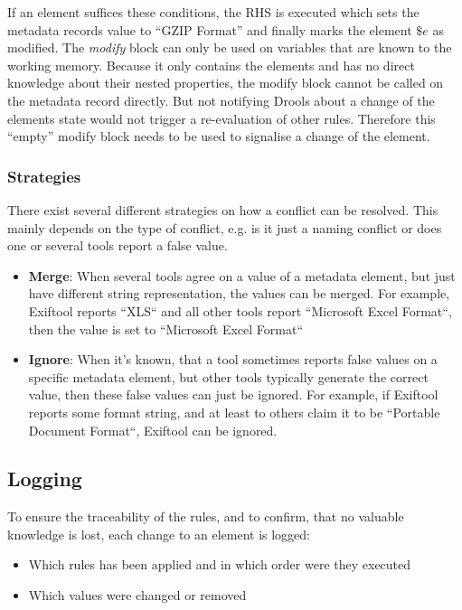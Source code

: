 \documentclass[a4paper,12pt]{article}
\begin{document}
If an element suffices these conditions, the RHS is executed which sets the metadata records value to ``GZIP Format'' and finally marks the element $\$e$ as modified. The \emph{modify} block can only be used on variables that are known to the working memory. Because it only contains the elements and has no direct knowledge about their nested properties, the modify block cannot be called on the metadata record directly. But not notifying Drools about a change of the elements state would not trigger a re-evaluation of other rules. Therefore this ``empty'' modify block needs to be used to signalise a change of the element.

\subsubsection{Strategies}

There exist several different strategies on how a conflict can be resolved. This mainly depends on the type of conflict, e.g. is it just a naming conflict or does one or several tools report a false value.

\begin{itemize}
\item \textbf{Merge}: When several tools agree on a value of a metadata element, but just have different string representation, the values can be merged. For example, Exiftool reports ``XLS`` and all other tools report ``Microsoft Excel Format``, then the value is set to ``Microsoft Excel Format``
\item \textbf{Ignore}: When it's known, that a tool sometimes reports false values on a specific metadata element, but other tools typically generate the correct value, then these false values can just be ignored. For example, if Exiftool reports some format string, and at least to others claim it to be ``Portable Document Format``, Exiftool can be ignored.

\end{itemize}


\subsection{Logging}

To ensure the traceability of the rules, and to confirm, that no valuable knowledge is lost, each change to an element is logged:
\begin{itemize}
\item Which rules has been applied and in which order were they executed
\item Which values were changed or removed
\end{itemize}
\end{document}
